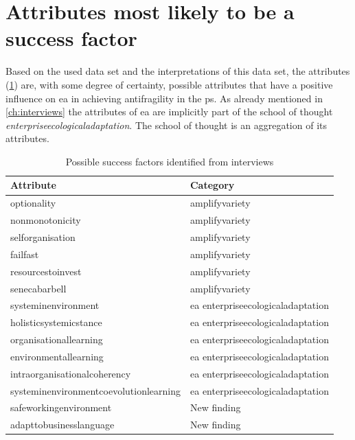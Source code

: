\section{Attributes most likely to be a success factor}
\label{sec:attributeslikelysf}
Based on the used data set and the interpretations of this data set, the attributes (\cref{tab:interviewpossiblesf}) are, with some degree of certainty, possible \glspl{attribute} that have a positive influence on \acrshort{ea} in achieving \gls{antifragility} in the \gls{ps}. As already mentioned in \cref{ch:interviews} the attributes of \acrshort{ea} are implicitly part of the school of thought \textit{\gls{enterpriseecologicaladaptation}}. The school of thought is an aggregation of its \glspl{attribute}.
\begin{table}[H]
	\begin{center}
			\begin{tabular}{@{}ll@{}}
				\toprule%
				\textbf{Attribute} & \textbf{Category}  \\%
				\midrule%
				\Gls{optionality} & \Gls{amplifyvariety} \\%
				\Gls{nonmonotonicity} & \Gls{amplifyvariety} \\%
				\Gls{selforganisation} & \Gls{amplifyvariety} \\%
				\Gls{failfast} & \Gls{amplifyvariety} \\%
				\Gls{resourcestoinvest} & \Gls{amplifyvariety} \\%
				\Gls{senecabarbell} & \Gls{amplifyvariety} \\%
				\Gls{systeminenvironment} & \acrshort{ea} \Gls{enterpriseecologicaladaptation} \\%
				\Gls{holisticsystemicstance} & \acrshort{ea} \Gls{enterpriseecologicaladaptation} \\%
				\Gls{organisationallearning} & \acrshort{ea} \Gls{enterpriseecologicaladaptation} \\%
				\Gls{environmentallearning} & \acrshort{ea} \Gls{enterpriseecologicaladaptation} \\%
				\Gls{intraorganisationalcoherency} & \acrshort{ea} \Gls{enterpriseecologicaladaptation} \\%
				\Gls{systeminenvironmentcoevolutionlearning} & \acrshort{ea} \Gls{enterpriseecologicaladaptation} \\%
				\Gls{safeworkingenvironment} & New finding \\%
				\Gls{adapttobusinesslanguage} & New finding \\%
				\bottomrule%
			\end{tabular}
		\caption{Possible success factors identified from interviews}
		\label{tab:interviewpossiblesf}
	\end{center}
\end{table}
